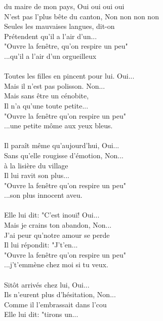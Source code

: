 
 du maire de mon pays, Oui oui oui oui
\\N'est pas l'plus bête du canton, Non non non non
\\Seules les mauvaises langues, dit-on
\\Prétendent qu'il a l'air d'un...
\\"Ouvre la fenêtre, qu'on respire un peu"
\\...qu'il a l'air d'un orgueilleux
\\\\Toutes les filles en pincent pour lui. Oui...
\\Mais il n'est pas polisson. Non...
\\Mais sans être un cénobite,
\\Il n'a qu'une toute petite...
\\"Ouvre la fenêtre qu'on respire un peu"
\\...une petite môme aux yeux bleus.
\\\\Il paraît même qu'aujourd'hui, Oui...
\\Sans qu'elle rougisse d'émotion, Non...
\\à la lisière du village
\\Il lui ravit son plus...
\\"Ouvre la fenêtre qu'on respire un peu"
\\...son plus innocent aveu.
\\\\Elle lui dit: "C'est inouï! Oui...
\\Mais je crains ton abandon, Non...
\\J'ai peur qu'notre amour se perde
\\Il lui répondit: "J't'en...
\\"Ouvre la fenêtre qu'on respire un peu"
\\...j't'emmène chez moi si tu veux.
\\\\Sitôt arrivés chez lui, Oui...
\\Ils n'eurent plus d'hésitation, Non...
\\Comme il l'embrassait dans l'cou
\\Elle lui dit: "tirons un...
